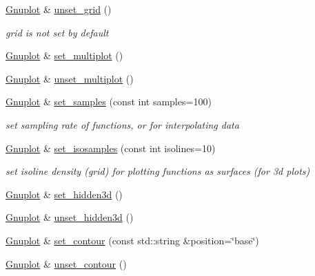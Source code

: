 \begin{DoxyCompactItemize}
\mbox{\hyperlink{class_gnuplot}{Gnuplot}} \& \mbox{\hyperlink{class_gnuplot_a53183e1487bc6977f0d46bf75d19b4d3}{unset\+\_\+grid}} ()
\begin{DoxyCompactList}\small\item\em grid is not set by default \end{DoxyCompactList}\item 
\mbox{\hyperlink{class_gnuplot}{Gnuplot}} \& \mbox{\hyperlink{class_gnuplot_a67efc4d4dc46b6100d14ba2f7366ef11}{set\+\_\+multiplot}} ()
\item 
\mbox{\hyperlink{class_gnuplot}{Gnuplot}} \& \mbox{\hyperlink{class_gnuplot_aad76cdec16cfb5fdf82f45ed2786f4d8}{unset\+\_\+multiplot}} ()
\item 
\mbox{\label{class_gnuplot_a671cbe7b18a267ea59f532c83a0035f6}} 
\mbox{\hyperlink{class_gnuplot}{Gnuplot}} \& \mbox{\hyperlink{class_gnuplot_a671cbe7b18a267ea59f532c83a0035f6}{set\+\_\+samples}} (const int samples=100)
\begin{DoxyCompactList}\small\item\em set sampling rate of functions, or for interpolating data \end{DoxyCompactList}\item 
\mbox{\label{class_gnuplot_ab810fa4c02fb49ae197786c305b78702}} 
\mbox{\hyperlink{class_gnuplot}{Gnuplot}} \& \mbox{\hyperlink{class_gnuplot_ab810fa4c02fb49ae197786c305b78702}{set\+\_\+isosamples}} (const int isolines=10)
\begin{DoxyCompactList}\small\item\em set isoline density (grid) for plotting functions as surfaces (for 3d plots) \end{DoxyCompactList}\item 
\mbox{\hyperlink{class_gnuplot}{Gnuplot}} \& \mbox{\hyperlink{class_gnuplot_a891f9800705eddc3f73886f265c009b8}{set\+\_\+hidden3d}} ()
\item 
\mbox{\hyperlink{class_gnuplot}{Gnuplot}} \& \mbox{\hyperlink{class_gnuplot_ab8688182047f746090e1e5f2a8c11c9e}{unset\+\_\+hidden3d}} ()
\item 
\mbox{\hyperlink{class_gnuplot}{Gnuplot}} \& \mbox{\hyperlink{class_gnuplot_af845efc728a90d7e10de764eff0b2423}{set\+\_\+contour}} (const std\+::string \&position=\char`\"{}base\char`\"{})
\item 
\mbox{\hyperlink{class_gnuplot}{Gnuplot}} \& \mbox{\hyperlink{class_gnuplot_a0b8522cb81e46dd4f5a22b7b48f977b1}{unset\+\_\+contour}} ()

\end{DoxyCompactItemize}
